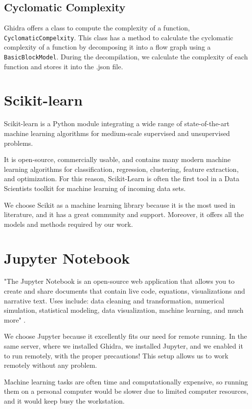 \subsection{Cyclomatic Complexity}


Ghidra offers a class to compute the complexity of a function, \texttt{CyclomaticCompelxity}. This class has a method to calculate the cyclomatic complexity of a function by decomposing it into a flow graph using a \texttt{BasicBlockModel}. During the decompilation, we calculate the complexity of each function and stores it into the .json file.


\section{Scikit-learn}
Scikit-learn is a Python module integrating a wide range of state-of-the-art machine learning algorithms for medium-scale supervised and unsupervised problems. 

It is open-source, commercially usable, and contains many modern machine learning algorithms for classification, regression, clustering, feature extraction, and optimization.
For this reason, Scikit-Learn is often the first tool in a Data Scientists toolkit for machine learning of incoming data sets. \cite{scikit-learn}

We choose Scikit as a machine learning library because it is the most used in literature, and it has a great community and support. Moreover, it offers all the models and methods required by our work. 
\section{Jupyter Notebook}

"The Jupyter Notebook is an open-source web application that allows you to create and share documents that contain live code, equations, visualizations and narrative text. Uses include: data cleaning and transformation, numerical simulation, statistical modeling, data visualization, machine learning, and much more" \cite{jupyter}.

We choose Jupyter because it excellently fits our need for remote running. In the same server, where we installed Ghidra, we installed Jupyter, and we enabled it to run remotely, with the proper precautions! This setup allows us to work remotely without any problem. 

Machine learning tasks are often time and computationally expensive, so running them on a personal computer would be slower due to limited computer resources, and it would keep busy the workstation.
